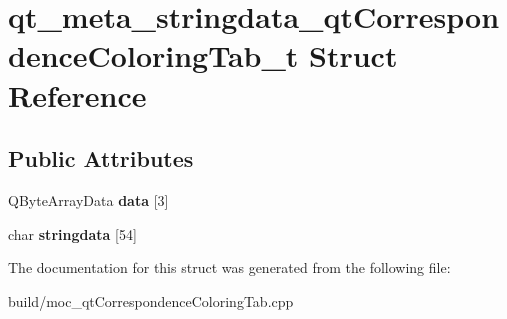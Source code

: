 \hypertarget{structqt__meta__stringdata__qt_correspondence_coloring_tab__t}{}\section{qt\+\_\+meta\+\_\+stringdata\+\_\+qt\+Correspondence\+Coloring\+Tab\+\_\+t Struct Reference}
\label{structqt__meta__stringdata__qt_correspondence_coloring_tab__t}
\subsection*{Public Attributes}
\begin{DoxyCompactItemize}
\item 
\hypertarget{structqt__meta__stringdata__qt_correspondence_coloring_tab__t_a8f9997a78891e426bf74cf662e218140}{}Q\+Byte\+Array\+Data {\bfseries data} \mbox{[}3\mbox{]}\label{structqt__meta__stringdata__qt_correspondence_coloring_tab__t_a8f9997a78891e426bf74cf662e218140}

\item 
\hypertarget{structqt__meta__stringdata__qt_correspondence_coloring_tab__t_a1fbb8434b528f989c3189ab3bfaa15c5}{}char {\bfseries stringdata} \mbox{[}54\mbox{]}\label{structqt__meta__stringdata__qt_correspondence_coloring_tab__t_a1fbb8434b528f989c3189ab3bfaa15c5}

\end{DoxyCompactItemize}


The documentation for this struct was generated from the following file\+:\begin{DoxyCompactItemize}
\item 
build/moc\+\_\+qt\+Correspondence\+Coloring\+Tab.\+cpp\end{DoxyCompactItemize}
